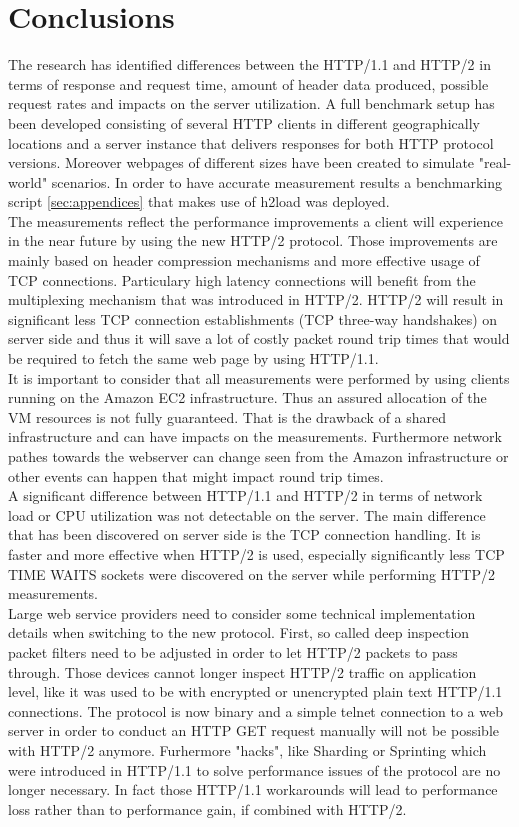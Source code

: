 \section{Conclusions}
\label{conclusion}

The research has identified differences between the HTTP/1.1 and HTTP/2 in terms of response and request time, amount of header data produced, possible request rates and impacts on the server utilization. A full benchmark setup has been developed consisting of several HTTP clients in different geographically locations and a server instance that delivers responses for both HTTP protocol versions. Moreover webpages of different sizes have been created to simulate "real-world" scenarios. In order to have accurate measurement results a benchmarking script \ref{sec:appendices} that makes use of h2load \cite{h2load} was deployed. 
\\
The measurements reflect the performance improvements a client will experience in the near future by using the new HTTP/2 protocol. Those improvements are mainly based on header compression mechanisms and more effective usage of TCP connections. Particulary high latency connections will benefit from the multiplexing mechanism that was introduced in HTTP/2. HTTP/2 will result in significant less TCP connection establishments (TCP three-way handshakes) on server side and thus it will save a lot of costly packet round trip times that would be required to fetch the same web page by using HTTP/1.1.
\\
It is important to consider that all measurements were performed by using clients running on the  Amazon EC2 infrastructure. Thus an assured allocation of the VM resources is not fully guaranteed. That is the drawback of a shared infrastructure and can have impacts on the measurements. Furthermore network pathes towards the webserver can change seen from the Amazon infrastructure or other events can happen that might impact round trip times.  
\\
A significant difference between HTTP/1.1 and HTTP/2 in terms of network load or CPU utilization was not detectable on the server. The main difference that has been discovered on server side is the TCP connection handling. It is faster and more effective when HTTP/2 is used, especially significantly less TCP TIME WAITS sockets were discovered on the server while performing HTTP/2 measurements.
\\
Large web service providers need to consider some technical implementation details when switching to the new protocol. First, so called deep inspection packet filters need to be adjusted in order to let HTTP/2 packets to pass through. Those devices cannot longer inspect HTTP/2 traffic on application level, like it was used to be with encrypted or unencrypted plain text HTTP/1.1 connections. The protocol is now binary and a simple telnet connection to a web server in order to conduct an HTTP GET request manually will not be possible with HTTP/2 anymore. Furhermore "hacks", like Sharding or Sprinting which were introduced in HTTP/1.1 to solve performance issues of the protocol are no longer necessary. In fact those HTTP/1.1 workarounds will lead to performance loss rather than to performance gain, if combined with HTTP/2.    

